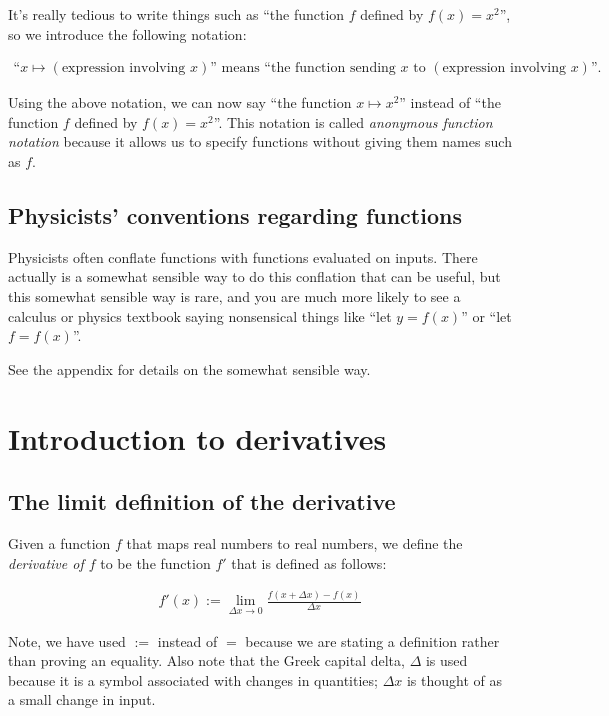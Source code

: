 \documentclass{article}
\begin{document}
It's really tedious to write things such as ``the function $f$ defined by $f(x) = x^2$'', so we introduce the following notation:

\begin{align*}
    \text{``}x \mapsto (\text{expression involving $x$}) \text{'' means ``the function sending $x$ to $(\text{expression involving $x$})$''}.
\end{align*}

Using the above notation, we can now say ``the function $x \mapsto x^2$'' instead of ``the function $f$ defined by $f(x) = x^2$''. This notation is called \textit{anonymous function notation} because it allows us to specify functions without giving them names such as $f$.

\subsection*{Physicists' conventions regarding functions}

Physicists often conflate functions with functions evaluated on inputs. There actually is a somewhat sensible way to do this conflation that can be useful, but this somewhat sensible way is rare, and you are much more likely to see a calculus or physics textbook saying nonsensical things like ``let $y = f(x)$'' or ``let $f = f(x)$''.

See the appendix for details on the somewhat sensible way.

\newpage

\section*{Introduction to derivatives}

\subsection*{The limit definition of the derivative}

Given a function $f$ that maps real numbers to real numbers, we define the \textit{derivative of $f$} to be the function $f'$ that is defined as follows:
     
\begin{align*}
     \boxed
     {
        f'(x) := \lim_{\Delta x \rightarrow 0} \frac{f(x + \Delta x) - f(x)}{\Delta x}
     }
\end{align*}

Note, we have used $:=$ instead of $=$ because we are stating a definition rather than proving an equality. Also note that the Greek capital delta, $\Delta$ is used because it is a symbol associated with changes in quantities; $\Delta x$ is thought of as a small change in input. 
\end{document}
